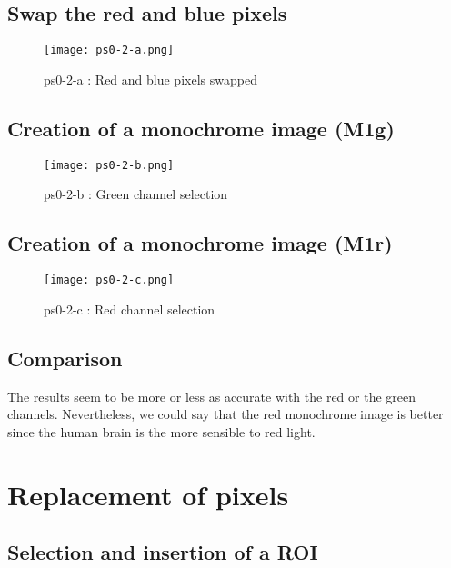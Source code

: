 \documentclass[a4paper,11pt]{article}
\begin{document}
\subsection{Swap the red and blue pixels }

\begin{figure}[H]
\centering
\texttt{[image: ps0-2-a.png]}
 \caption{ps0-2-a : Red and blue pixels swapped}
\label{ps0-2-a}
\end{figure}

\subsection{Creation of a monochrome image (M1g)}

\begin{figure}[H]
\centering
\texttt{[image: ps0-2-b.png]}
 \caption{ps0-2-b : Green channel selection}
\label{ps0-2-b}
\end{figure}

\subsection{Creation of a monochrome image (M1r) }

\begin{figure}[H]
\centering
\texttt{[image: ps0-2-c.png]}
 \caption{ps0-2-c : Red channel selection}
\label{ps0-2-c}
\end{figure}

\subsection{Comparison }

The results seem to be more or less as accurate with the red or the green channels. Nevertheless, we could say that the red monochrome image is better since the human brain is the more sensible to red light.

\section{Replacement of pixels}
\subsection{Selection and insertion of a ROI}
\end{document}
